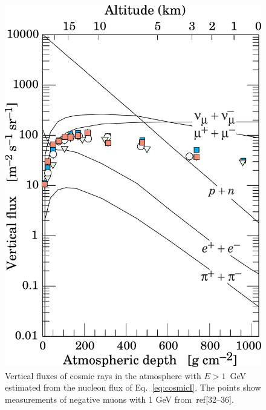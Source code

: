 \begin{figure}
   \centering
   \includegraphics[scale=0.20]{pics/muonflux}
   \caption{Vertical fluxes of cosmic rays in the atmosphere with $E > 1$~GeV estimated %
     from the nucleon flux of Eq.~\ref{eq:cosmicI}. The points show measurements of negative muons %
     with 1 GeV from~ref[32–36].}
   \label{fig:muonflux}
\end{figure}

